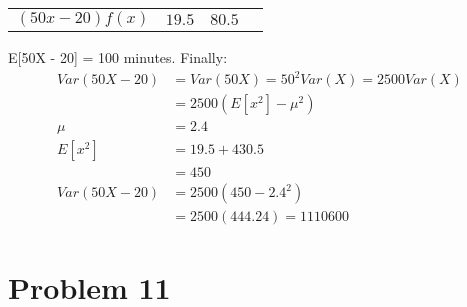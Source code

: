 \documentclass{article}
\begin{document}
\begin{enumerate}[label = \alph*)]
\begin{center}
\begin{tabular}{c|ccc}
                  \((50x - 20)f(x)\) & \(19.5\) & \(80.5\)
              \end{tabular}
          \end{center}
          E[50X - 20] = 100 minutes. Finally:
          \begin{align*}
              Var(50X - 20) & = Var(50X) = 50^2Var(X) = 2500Var(X) \\
                            & = 2500 (E[x^2] - \mu^2)              \\
              \mu           & = 2.4                                \\
              E[x^2]        & = 19.5 + 430.5                       \\
                            & = 450                                \\
              Var(50X - 20) & = 2500 (450 - 2.4^2)                 \\
                            & = 2500 (444.24) = 1110600
          \end{align*}
\end{enumerate}

\pagebreak

\section*{Problem 11}
\end{document}
